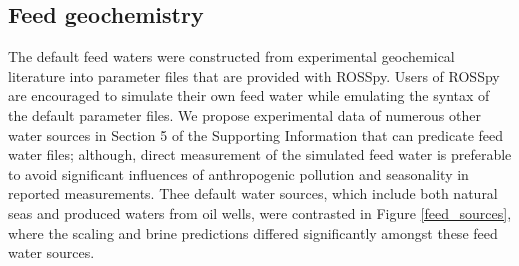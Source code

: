 \subsection{Feed geochemistry}
The default feed waters were constructed from experimental geochemical literature into parameter files that are provided with ROSSpy. Users of ROSSpy are encouraged to simulate their own feed water while emulating the syntax of the default parameter files. We propose experimental data of numerous other water sources in Section 5 of the Supporting Information that can predicate feed water files; although, direct measurement of the simulated feed water is preferable to avoid significant influences of anthropogenic pollution \cite{Chen2008SourcesSea} and seasonality \cite{Sarthou2001SeasonalSea} in reported measurements. Thee default water sources, which include both natural seas and produced waters from oil wells, were contrasted in Figure \ref{feed_sources}, where the scaling and brine predictions differed significantly amongst these feed water sources. 

